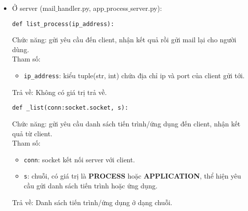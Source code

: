 \begin{itemize}
\item Ở server (mail$\_$handler.py, app$\_$process$\_$server.py):
\begin{lstlisting}
def list_process(ip_address):
\end{lstlisting}
Chức năng: gửi yêu cầu đến client, nhận kết quả rồi gửi mail lại cho người dùng.\\
Tham số: 
\begin{itemize}
\item \lstinline{ip_address}: kiểu tuple(str, int) chứa địa chỉ ip và port của client gửi tới.
\end{itemize}
Trả về: Không có giá trị trả về.
\begin{lstlisting}
def _list(conn:socket.socket, s):
\end{lstlisting}
Chức năng: gửi yêu cầu danh sách tiến trình/ứng dụng đến client, nhận kết quả từ client.\\
Tham số: 
\begin{itemize}
\item \lstinline{conn}: socket kết nối server với client.
\item \lstinline{s}: chuỗi, có giá trị là \textbf{PROCESS} hoặc \textbf{APPLICATION}, thể hiện yêu cầu gửi danh sách tiến trình hoặc ứng dụng.
\end{itemize}
Trả về: Danh sách tiến trình/ứng dụng ở dạng chuỗi.
\begin{lstlisting}


\end{lstlisting}
\end{itemize}
